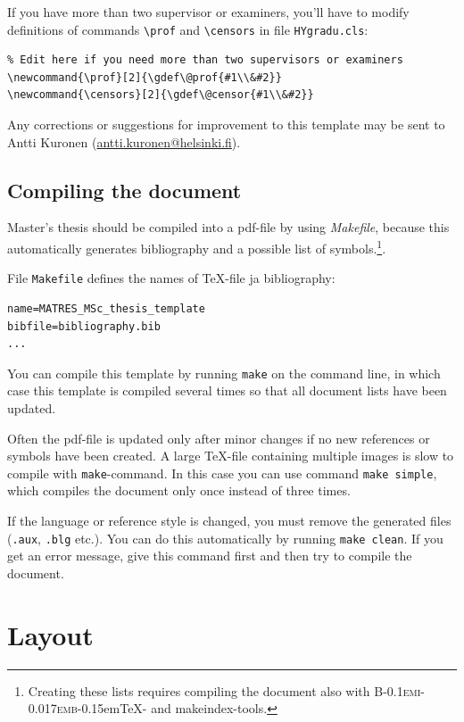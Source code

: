 \documentclass[english,twoside,openright]{HYgradu}
\begin{document}
If you have more than two supervisor or examiners, you'll have to modify
definitions of commands \verb|\prof| and \verb|\censors| in file
\texttt{HYgradu.cls}:
\begin{verbatim}
% Edit here if you need more than two supervisors or examiners
\newcommand{\prof}[2]{\gdef\@prof{#1\\&#2}}
\newcommand{\censors}[2]{\gdef\@censor{#1\\&#2}}
\end{verbatim}

Any corrections or suggestions for improvement to this template may be
sent to Antti Kuronen
(\href{mailto:antti.kuronen@helsinki.fi}{antti.kuronen@helsinki.fi}).

\section{Compiling the document}
\label{sec:compile}

Master's thesis should be compiled into a pdf-file by using
\emph{Makefile}, because this automatically generates bibliography and
a possible list of symbols.\footnote{Creating these lists requires
  compiling the document also with
  \textsc{B\kern-0.1emi\kern-0.017emb}\kern-0.15em\TeX- and
  makeindex-tools.}.

File \texttt{Makefile} defines the names of \TeX-file ja bibliography:
\begin{verbatim}
name=MATRES_MSc_thesis_template
bibfile=bibliography.bib
...
\end{verbatim}
You can compile this template by running \texttt{make} on the command
line, in which case this template is compiled several times so that
all document lists have been updated.

Often the pdf-file is updated only after minor changes if no new
references or symbols have been created. A large \TeX-file containing
multiple images is slow to compile with \texttt{make}-command.  In
this case you can use command \texttt{make simple}, which compiles the
document only once instead of three times.

If the language or reference style is changed, you must remove the
generated files (\texttt{.aux}, \texttt{.blg} etc.). You can do this
automatically by running \texttt{make clean}. If you get an error
message, give this command first and then try to compile the document.

\chapter{Layout}
\end{document}
